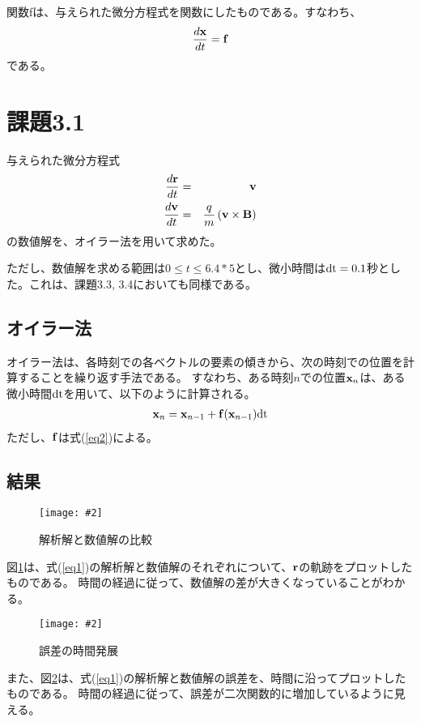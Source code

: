 \documentclass[11pt]{jsarticle}
\newcommand{\fg}[3]{ %
	\begin{figure}
		\texttt{[image: \#2]}
		\caption{#3}
		\label{#1}
	\end{figure}
}
\newcommand{\fr}[1]{図\ref{#1}}
\newcommand{\er}[1]{式(\ref{#1})}
\begin{document}
                関数fは、与えられた微分方程式を関数にしたものである。すなわち、
                \[
                    \frac{d{\bf x}}{dt} = {\bf f} \label{eq2}
                \]
                である。

    \section{課題3.1}
        与えられた微分方程式
        \begin{eqnarray}
        \begin{split}
            \frac{d{\bf r}}{dt} & = & {\bf v}\\
            \frac{d{\bf v}}{dt} & = & \frac{q}{m}\left( {\bf v} \times {\bf B} \right)
        \end{split}
            \label{eq1}
        \end{eqnarray}
        の数値解を、オイラー法を用いて求めた。

        ただし、数値解を求める範囲は$0 \leq t \leq 6.4 * 5$とし、微小時間は${\rm dt} = 0.1$秒とした。これは、課題3.3, 3.4においても同様である。

        \subsection{オイラー法}
            オイラー法は、各時刻での各ベクトルの要素の傾きから、次の時刻での位置を計算することを繰り返す手法である。
            すなわち、ある時刻$n$での位置${\bf x}_n$は、ある微小時間${\rm dt}$を用いて、以下のように計算される。
            \begin{eqnarray*}
                {\bf x}_n = {\bf x}_{n-1} + {\bf f}({\bf x}_{n-1}) {\rm dt}
            \end{eqnarray*}
            ただし、${\bf f}$は\er{eq2}による。
        
        \subsection{結果}
            \fg{fig1}{graphs/euler/rc_ra.eps}{解析解と数値解の比較} 

            \fr{fig1}は、\er{eq1}の解析解と数値解のそれぞれについて、${\bf r}$の軌跡をプロットしたものである。
            時間の経過に従って、数値解の差が大きくなっていることがわかる。

            \fg{fig2}{graphs/euler/error_by_time.eps}{誤差の時間発展}

            また、\fr{fig2}は、\er{eq1}の解析解と数値解の誤差を、時間に沿ってプロットしたものである。
            時間の経過に従って、誤差が二次関数的に増加しているように見える。
\end{document}
